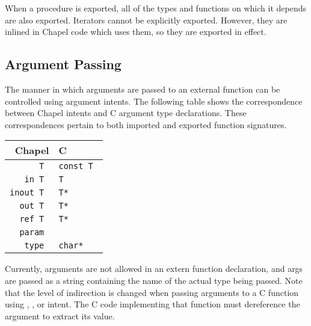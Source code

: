 When a procedure is exported, all of the types and functions on which it depends
are also exported.  Iterators cannot be explicitly exported.  However, they are
inlined in Chapel code which uses them, so they are exported in effect.

\subsection{Argument Passing}
\label{Interop_Argument_Passing}

The manner in which arguments are passed to an external function can be
controlled using argument intents.  The following table shows the correspondence
between Chapel intents and C argument type declarations.  These correspondences
pertain to both imported and exported function signatures.

\begin{tabular}{rl}
Chapel & C \\
\hline
\tt T & \tt const T \\
\tt in T & \tt T \\
\tt inout T & \tt T* \\
\tt out T & \tt T* \\
\tt ref T & \tt T* \\
\tt param & \tt \\
\tt type & \tt char*\\
\end{tabular}

Currently,  arguments are not allowed in an extern function
declaration, and  args are passed as a string containing the name of
the actual type being passed.  Note that the level of indirection is changed
when passing arguments to a C function using , ,
or  intent.  The C code implementing that function must dereference
the argument to extract its value.
